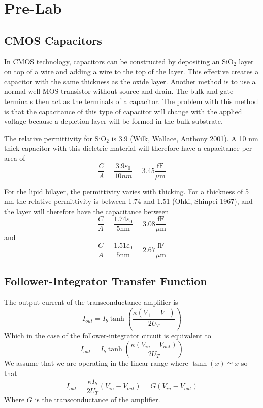 


\newpage
\section{Pre-Lab}
\subsection{CMOS Capacitors}
In CMOS technology, capacitors can be constructed by depositing an \(\mathrm{SiO_2}\) layer on top of a wire and
adding a wire to the top of the layer. This effective creates a capacitor with the same thickness as the oxide layer.
Another method is to use a normal well MOS transistor without source and drain. The bulk and gate terminals then
act as the terminals of a capacitor. The problem with this method is that the capacitance of this type of capacitor 
will change with the applied voltage because a depletion layer will be formed in the bulk substrate.

The relative permittivity for \(\mathrm{SiO_2}\) is 3.9 (Wilk, Wallace, Anthony 2001). A 10 nm thick capacitor with this dieletric
material will therefore have a capacitance per area of 
\begin{equation*}
    \frac{C}{A} = \frac{3.9\varepsilon_0}{10nm} = 3.45 \frac{\mathrm{fF}}{\mu\mathrm{m}}
\end{equation*}

For the lipid bilayer, the permittivity varies with thicking. For a thickness of 5 nm the relative permittivity is between 1.74 and 1.51 (Ohki, Shinpei 1967),
and the layer will therefore have the capacitance between
\begin{equation*}
    \frac{C}{A} = \frac{1.74\varepsilon_0}{5\mathrm{nm}} = 3.08 \frac{\mathrm{fF}}{\mu\mathrm{m}}
\end{equation*}
and
\begin{equation*}
    \frac{C}{A} = \frac{1.51\varepsilon_0}{5\mathrm{nm}} = 2.67 \frac{\mathrm{fF}}{\mu\mathrm{m}}
\end{equation*}

\subsection{Follower-Integrator Transfer Function}
The output current of the transconductance amplifier is
\begin{equation*}
    I_{out} = I_b\tanh\left(\frac{\kappa \left( V_+ - V_- \right)}{2U_T}\right)
\end{equation*}
Which in the case of the follower-integrator circuit is equivalent to 
\begin{equation*}
    I_{out} = I_b\tanh\left(\frac{\kappa \left( V_{in} - V_{out} \right)}{2U_T}\right)
\end{equation*}
We assume that we are operating in the linear range where \(\tanh(x) \simeq x\) so that
\begin{equation*}
    I_{out} = \frac{\kappa I_b}{2U_T}\left(V_{in} - V_{out}\right) = G\left(V_{in} - V_{out}\right)
\end{equation*}
Where \(G\) is the transconductance of the amplifier.

